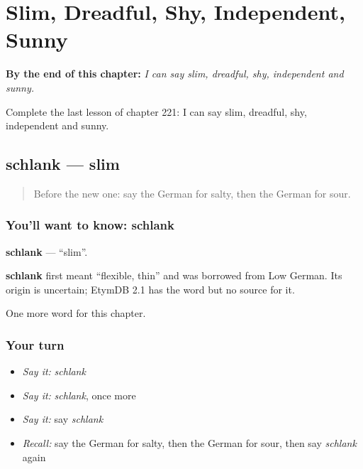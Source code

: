 
\chapter{Slim, Dreadful, Shy, Independent, Sunny}
\label{ch:ge-slim-dreadful-shy-independent-sunny}

\begin{chapteropening}
\textbf{By the end of this chapter:} \emph{I can say slim, dreadful, shy, independent and sunny.}

Complete the last lesson of chapter 221: I can say slim, dreadful, shy, independent and sunny.
\end{chapteropening}

\section[schlank]{schlank — slim}

\label{lesson:GE-C221-schlank}



\begin{quote}
Before the new one: say the German for salty, then the German for sour.
\end{quote}

\subsection*{You'll want to know: schlank}
\textbf{schlank} — \textquotedblleft{}slim\textquotedblright{}.

\begin{cousinweb}
\textbf{schlank} first meant \textquotedblleft{}flexible, thin\textquotedblright{} and was borrowed from Low German. Its origin is uncertain; EtymDB 2.1 has the word but no source for it.
\end{cousinweb}

\begin{grammarlens}[title={What you've built}]
One more word for this chapter.
\end{grammarlens}

\subsection*{Your turn}
\begin{itemize}
\raggedright
  \item \emph{Say it:} \emph{schlank}
  \item \emph{Say it:} \emph{schlank}, once more
  \item \emph{Say it:} say \emph{schlank}
  \item \emph{Recall:} say the German for salty, then the German for sour, then say \emph{schlank} again
\end{itemize}

